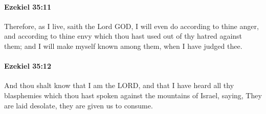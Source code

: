 		\paragraph{Ezekiel 35:11} %
			\label{EZEKIEL-35-11}

			Therefore, as I live, saith the Lord GOD, I will even do according to thine anger, and according to thine envy which thou hast used out of thy hatred against them; and I will make myself known among them, when I have judged thee.


		\paragraph{Ezekiel 35:12} %
			\label{EZEKIEL-35-12}

			And thou shalt know that I am the LORD, and that I have heard all thy blasphemies which thou hast spoken against the mountains of Israel, saying, They are laid desolate, they are given us to consume.


